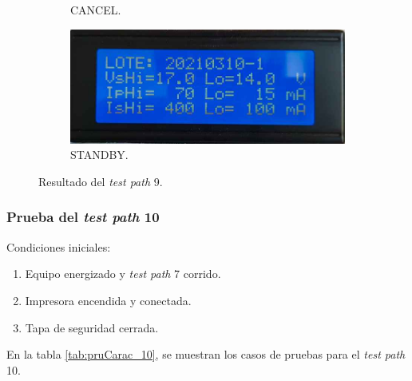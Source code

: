 \begin{figure}[!htpb]
\begin{subfigure}[b]{0.4\textwidth}
         \caption{CANCEL.}
         \label{fig:pruConf_9_3}
     \end{subfigure}
           \hfill
     \begin{subfigure}[b]{0.4\textwidth}
         \centering
         \includegraphics[width=1.1\textwidth]{./Figures/pru_fail.jpeg}
         \caption{STANDBY.}
         \label{fig:pruConf_9_4}
     \end{subfigure}
        \caption{Resultado del \textit{test path} 9.}
        \label{fig:pruConf_9_res}
\end{figure}

\subsubsection{Prueba del \textit{test path} 10}
\label{subsubsec:pruCarac_10}

Condiciones iniciales: 

\begin{enumerate}
	\item Equipo energizado y \textit{test path} 7 corrido.
	\item Impresora encendida y conectada.
	\item Tapa de seguridad cerrada.
\end{enumerate}

En la tabla \ref{tab:pruCarac_10}, se muestran los casos de pruebas para el \textit{test path} 10.

